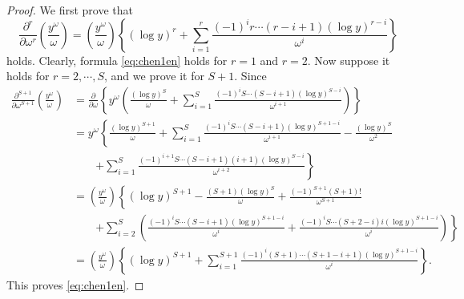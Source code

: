 \begin{proof}
We first prove that
\begin{equation}\label{eq:chen1en}
\frac{\partial^r}{\partial\omega^r}\left(\frac{y^\omega}{\omega}\right)
=\left(\frac{y^\omega}{\omega}\right)\left\{(
\log y)^r+
\sum_{i=1}^{r}\frac{(-1)^i r\cdots(r-i+1)(\log y)^{r-i}}{\omega^i}\right\}
\end{equation}
holds. Clearly, formula \eqref{eq:chen1en} holds for $r=1$ and $r=2$. Now suppose it holds for $r=2,\cdots,S$, and we prove it for $S+1$. Since
\begin{align*}
\frac{\partial^{S+1}}{\partial\omega^{S+1}}\left(\frac{y^\omega}{\omega}\right)
&=\frac{\partial}{\partial\omega}\left\{y^\omega\left(\frac{(\log y)^S}{\omega}
+\sum_{i=1}^{S}\frac{(-1)^i S\cdots(S-i+1)(\log y)^{S-i}}{\omega^{i+1}}\right)\right\}\\
&=y^\omega\left\{\frac{(\log y)^{S+1}}{\omega}
+\sum_{i=1}^{S}\frac{(-1)^i S\cdots(S-i+1)(\log y)^{S+1-i}}{\omega^{i+1}}
-\frac{(\log y)^S}{\omega^2}\right.\\
&\qquad\left.+\sum_{i=1}^{S}\frac{(-1)^{i+1}S\cdots(S-i+1)(i+1)(\log y)^{S-i}}{\omega^{i+2}}\right\}\\
&=\left(\frac{y^\omega}{\omega}\right)\left\{(
\log y)^{S+1}
-\frac{(S+1)(\log y)^S}{\omega}
+\frac{(-1)^{S+1}(S+1)!}{\omega^{S+1}}\right.\\
&\qquad\left.+\sum_{i=2}^{S}\left(
\frac{(-1)^i S\cdots(S-i+1)(\log y)^{S+1-i}}{\omega^i}
+\frac{(-1)^i S\cdots(S+2-i)i(\log y)^{S+1-i}}{\omega^i}
\right)\right\}\\
&=\left(\frac{y^\omega}{\omega}\right)\left\{(
\log y)^{S+1}
+\sum_{i=1}^{S+1}\frac{(-1)^i(S+1)\cdots(S+1-i+1)(\log y)^{S+1-i}}{\omega^i}\right\}.
\end{align*}
This proves \eqref{eq:chen1en}.


\end{proof}
